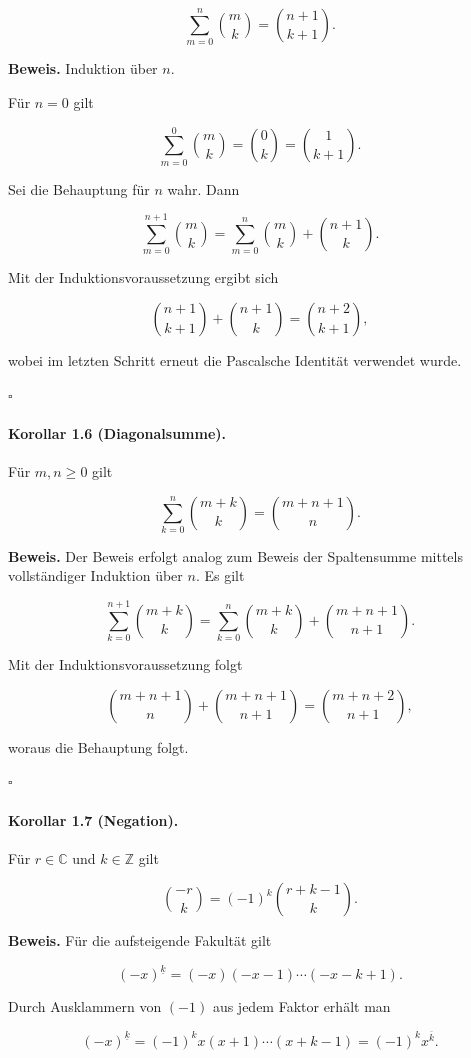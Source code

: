 \documentclass{article}
\begin{document}
\[
\sum_{m=0}^{n}\binom{m}{k}
=
\binom{n+1}{k+1}.
\]

\textbf{Beweis.}
Induktion über \(n\).

Für \(n=0\) gilt

\[
\sum_{m=0}^{0}\binom{m}{k}
=
\binom{0}{k}
=
\binom{1}{k+1}.
\]

Sei die Behauptung für \(n\) wahr. Dann

\[
\sum_{m=0}^{n+1}\binom{m}{k}
=
\sum_{m=0}^{n}\binom{m}{k}
+
\binom{n+1}{k}.
\]

Mit der Induktionsvoraussetzung ergibt sich

\[
\binom{n+1}{k+1}
+
\binom{n+1}{k}
=
\binom{n+2}{k+1},
\]

wobei im letzten Schritt erneut die Pascalsche Identität verwendet wurde.

\hfill\(\square\)

\paragraph{Korollar 1.6 (Diagonalsumme).}
Für \(m,n\ge 0\) gilt

\[
\sum_{k=0}^{n}\binom{m+k}{k}
=
\binom{m+n+1}{n}.
\]

\textbf{Beweis.}
Der Beweis erfolgt analog zum Beweis der Spaltensumme mittels vollständiger Induktion über \(n\). Es gilt

\[
\sum_{k=0}^{n+1}\binom{m+k}{k}
=
\sum_{k=0}^{n}\binom{m+k}{k}
+
\binom{m+n+1}{n+1}.
\]

Mit der Induktionsvoraussetzung folgt

\[
\binom{m+n+1}{n}
+
\binom{m+n+1}{n+1}
=
\binom{m+n+2}{n+1},
\]

woraus die Behauptung folgt.

\hfill\(\square\)

\paragraph{Korollar 1.7 (Negation).}
Für \(r\in\mathbb C\) und \(k\in\mathbb Z\) gilt

\[
\binom{-r}{k}
=
(-1)^k
\binom{r+k-1}{k}.
\]

\textbf{Beweis.}
Für die aufsteigende Fakultät gilt

\[
(-x)^{\underline{k}}
=
(-x)(-x-1)\cdots(-x-k+1).
\]

Durch Ausklammern von \((-1)\) aus jedem Faktor erhält man

\[
(-x)^{\underline{k}}
=
(-1)^k x(x+1)\cdots(x+k-1)
=
(-1)^k x^{\overline{k}}.
\]
\end{document}
